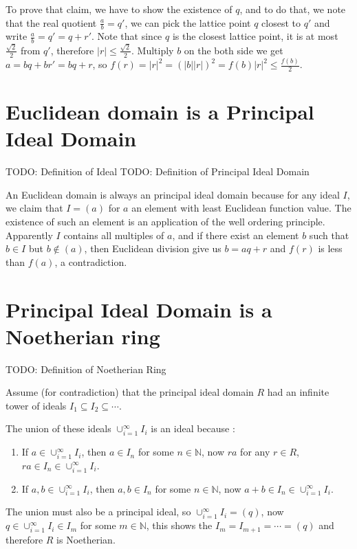 \documentclass{article}
\begin{document}
To prove that claim, we have to show the existence of $ q $, and to do that, we note that the real quotient $ \frac{a}{b} = q' $, we can pick the lattice point $ q $ closest to $ q' $ and write $ \frac{a}{b} = q' = q + r' $. Note that since $ q $ is the closest lattice point, it is at most $ \frac{\sqrt{2}}{2} $ from $ q' $, therefore $ |r| \le \frac{\sqrt{2}}{2} $. Multiply $ b $ on the both side we get $ a = bq + br' = bq + r $, so $ f(r) = |r|^2 = (|b||r|)^2 = f(b)|r|^2 \le \frac{f(b)}{2} $. 

\section*{Euclidean domain is a Principal Ideal Domain}
TODO: Definition of Ideal
TODO: Definition of Principal Ideal Domain

An Euclidean domain is always an principal ideal domain because for any ideal $ I $, we claim that $ I = (a) $ for $ a $ an element with least Euclidean function value. The existence of such an element is an application of the well ordering principle. Apparently $ I $ contains all multiples of $ a $, and if there exist an element $ b $ such that $ b \in I $ but $ b \notin (a) $, then Euclidean division give us $ b = aq + r $ and $ f(r) $ is less than $ f(a) $, a contradiction. 

\section*{Principal Ideal Domain is a Noetherian ring}
TODO: Definition of Noetherian Ring

Assume (for contradiction) that the principal ideal domain $ R $ had an infinite tower of ideals $ I_1 \subseteq I_2 \subseteq \cdots $.

The union of these ideals $ \cup_{i=1}^{\infty} I_i $ is an ideal because :

\begin{enumerate}
    \item{If $ a \in \cup_{i=1}^{\infty} I_i $, then $ a \in I_n $ for some $ n \in \mathbb{N} $, now $ ra $ for any $ r \in R $, $ ra \in I_n \in \cup_{i=1}^{\infty} I_i $.}
    \item{If $ a,b \in \cup_{i=1}^{\infty} I_i $, then $ a,b \in I_n $ for some $ n \in \mathbb{N} $, now $ a + b \in I_n \in \cup_{i=1}^{\infty} I_i $.}
\end{enumerate}

The union must also be a principal ideal, so $ \cup_{i=1}^{\infty} I_i = (q) $, now $ q \in \cup_{i=1}^{\infty} I_i \in I_m $ for some $ m \in \mathbb{N} $, this shows the $ I_{m} = I_{m+1} = \cdots = (q) $ and therefore $ R $ is Noetherian.
\end{document}
